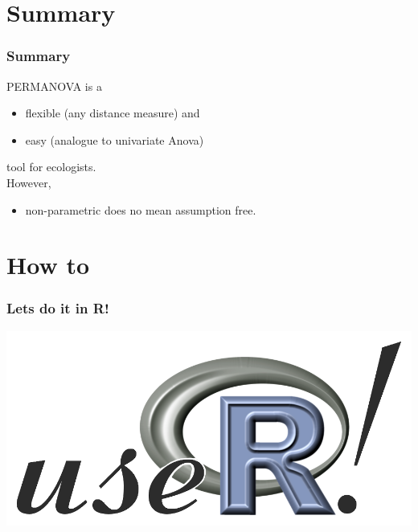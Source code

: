 \documentclass[10pt]{beamer}\usepackage[]{graphicx}\usepackage[]{color}
\begin{document}
% 


\section{Summary}
\begin{frame}
\frametitle{Summary}
PERMANOVA is a
  \begin{itemize}
    \item flexible (any distance measure) and
    \item easy (analogue to univariate Anova)
  \end{itemize}
tool for ecologists. \\[2em]

\pause
However,
  \begin{itemize}
    \item non-parametric does no mean assumption free.
  \end{itemize}
\end{frame}

\section{How to}
\begin{frame}
\frametitle{Lets do it in R!}
\includegraphics[width=\textwidth]{pics/user.png}
\end{frame}
\end{document}
